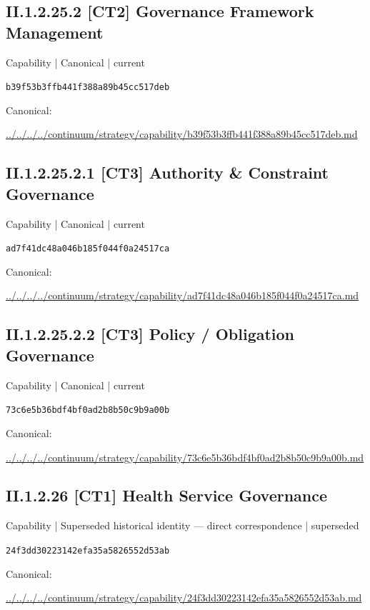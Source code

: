 \documentclass[10pt,a4paper]{article}
\begin{document}
\subsection*{II.1.2.25.2 [CT2] Governance Framework Management}
{\small Capability | Canonical | current}\par
\texttt{b39f53b3ffb441f388a89b45cc517deb}\par
Canonical: \par
{\footnotesize\url{../../../../continuum/strategy/capability/b39f53b3ffb441f388a89b45cc517deb.md}}\par
\subsection*{II.1.2.25.2.1 [CT3] Authority \& Constraint Governance}
{\small Capability | Canonical | current}\par
\texttt{ad7f41dc48a046b185f044f0a24517ca}\par
Canonical: \par
{\footnotesize\url{../../../../continuum/strategy/capability/ad7f41dc48a046b185f044f0a24517ca.md}}\par
\subsection*{II.1.2.25.2.2 [CT3] Policy / Obligation Governance}
{\small Capability | Canonical | current}\par
\texttt{73c6e5b36bdf4bf0ad2b8b50c9b9a00b}\par
Canonical: \par
{\footnotesize\url{../../../../continuum/strategy/capability/73c6e5b36bdf4bf0ad2b8b50c9b9a00b.md}}\par
\subsection*{II.1.2.26 [CT1] Health Service Governance}
{\small Capability | Superseded historical identity — direct correspondence | superseded}\par
\texttt{24f3dd30223142efa35a5826552d53ab}\par
Canonical: \par
{\footnotesize\url{../../../../continuum/strategy/capability/24f3dd30223142efa35a5826552d53ab.md}}\par
\end{document}
